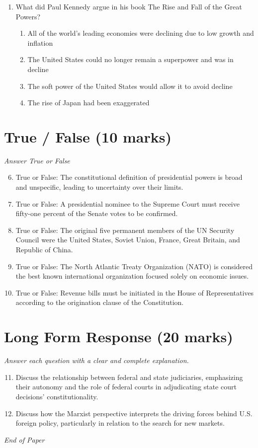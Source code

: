 \documentclass[12pt]{article}
\begin{document}
\begin{enumerate}[label=\arabic*.]
\begin{enumerate}[label=(\alph*)]
    \item reduce the federal deficit
    \item limit the president's ability to conduct foreign policy
\end{enumerate}
\item What did Paul Kennedy argue in his book The Rise and Fall of the Great Powers?
\begin{enumerate}[label=(\alph*)]
    \item All of the world's leading economies were declining due to low growth and inflation
    \item The United States could no longer remain a superpower and was in decline
    \item The soft power of the United States would allow it to avoid decline
    \item The rise of Japan had been exaggerated
\end{enumerate}
\end{enumerate}

\section*{True / False (10 marks)}
\textit{Answer True or False}
\begin{enumerate}[label=\arabic*.]
\setcounter{enumi}{5}
\item True or False: The constitutional definition of presidential powers is broad and unspecific, leading to uncertainty over their limits.
\item True or False: A presidential nominee to the Supreme Court must receive fifty-one percent of the Senate votes to be confirmed.
\item True or False: The original five permanent members of the UN Security Council were the United States, Soviet Union, France, Great Britain, and Republic of China.
\item True or False: The North Atlantic Treaty Organization (NATO) is considered the best known international organization focused solely on economic issues.
\item True or False: Revenue bills must be initiated in the House of Representatives according to the origination clause of the Constitution.
\end{enumerate}

\section*{Long Form Response (20 marks)}
\textit{Answer each question with a clear and complete explanation.}
\begin{enumerate}[label=\arabic*.]
\setcounter{enumi}{10}
\item Discuss the relationship between federal and state judiciaries, emphasizing their autonomy and the role of federal courts in adjudicating state court decisions' constitutionality.
\item Discuss how the Marxist perspective interprets the driving forces behind U.S. foreign policy, particularly in relation to the search for new markets.
\end{enumerate}

\vfill
\noindent\textit{End of Paper}
\end{document}
